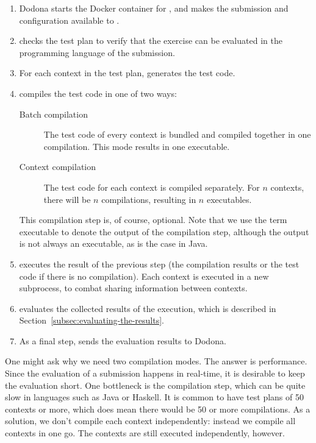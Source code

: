 \documentclass[5p,number]{elsarticle}
\begin{document}
    \begin{enumerate}
        \item Dodona starts the Docker container for \tested{} , and makes the submission and configuration available to \tested{}.
        \item \tested{} checks the test plan to verify that the exercise can be evaluated in the programming language of the submission.
        \item For each context in the test plan, \tested{} generates the test code.
        \item \tested{} compiles the test code in one of two ways:
        \begin{description}
            \item[Batch compilation] The test code of every context is bundled and compiled together in one compilation.
            This mode results in one executable.
            \item[Context compilation] The test code for each context is compiled separately.
            For $n$ contexts, there will be $n$ compilations, resulting in $n$ executables.
        \end{description}
        This compilation step is, of course, optional.
        Note that we use the term executable to denote the output of the compilation step, although the output is not always an executable, as is the case in Java.
        \item \tested{} executes the result of the previous step (the compilation results or the test code if there is no compilation).
        Each context is executed in a new subprocess, to combat sharing information between contexts.
        \item \tested{} evaluates the collected results of the execution, which is described in Section~\ref{subsec:evaluating-the-results}.
        \item As a final step, \tested{} sends the evaluation results to Dodona.
    \end{enumerate}
    
    One might ask why we need two compilation modes.
    The answer is performance.
    Since the evaluation of a submission happens in real-time, it is desirable to keep the evaluation short.
    One bottleneck is the compilation step, which can be quite slow in languages such as Java or Haskell.
    It is common to have test plans of 50 contexts or more, which does mean there would be 50 or more compilations.
    As a solution, we don't compile each context independently: instead we compile all contexts in one go.
    The contexts are still executed independently, however.
\end{document}
